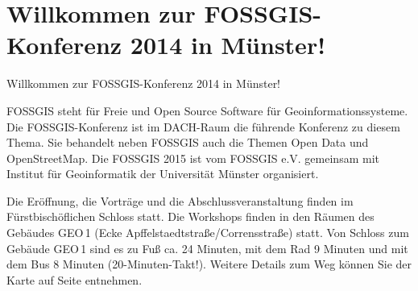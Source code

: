 \newpage
\section*{Willkommen zur FOSSGIS-Konferenz 2014 in Münster!} \label{welcome}
Willkommen zur FOSSGIS-Konferenz 2014 in Münster!

FOSSGIS steht für Freie und Open Source Software für Geoinformationssysteme. 
Die FOSSGIS-Konferenz ist im DACH-Raum die führende Konferenz zu diesem Thema. Sie behandelt neben
FOSSGIS auch die Themen Open Data und OpenStreetMap.
Die FOSSGIS 2015 ist vom FOSSGIS e.V. gemeinsam mit Institut für Geoinformatik der 
Universität Münster organisiert.

Die Eröffnung, die Vorträge und die Abschlussveranstaltung finden im Fürstbischöflichen Schloss statt. 
Die Workshops finden in den Räumen des Gebäudes GEO\,1 (Ecke Apffelstaedtstraße/Corrensstraße) statt. Von Schloss 
zum Gebäude GEO\,1 sind es zu Fuß ca. 24 Minuten, mit dem Rad 9 Minuten und mit dem Bus 8 Minuten (20-Minuten-Takt!).
Weitere Details zum Weg können Sie der Karte auf Seite \pageref{karte} entnehmen.